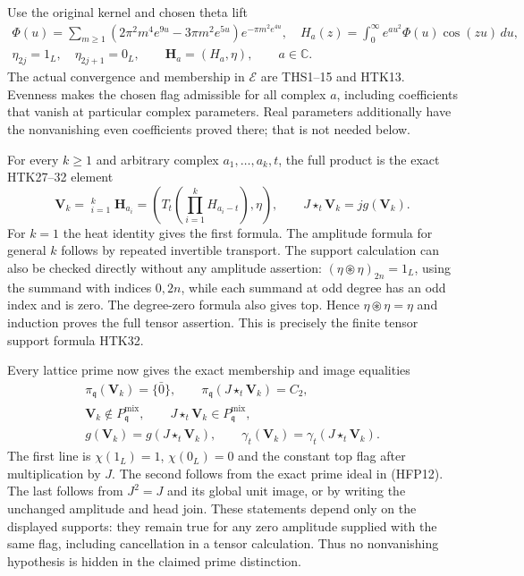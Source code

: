 Use the original kernel and chosen theta lift
\begin{equation}\tag{HFP31}
\begin{gathered}
 \Phi(u)=\sum_{m\ge1}
  (2\pi^2m^4e^{9u}-3\pi m^2e^{5u})e^{-\pi m^2e^{4u}},\quad
 H_a(z)=\int_0^\infty e^{au^2}\Phi(u)\cos(zu)\,du,\\
 \eta_{2j}=1_L,\quad\eta_{2j+1}=0_L,\qquad
 \mathbf H_a=(H_a,\eta),\qquad a\in\mathbb C.
\end{gathered}
\end{equation}
The actual convergence and membership in $\mathcal E$
are THS1--15 and HTK13. Evenness makes the chosen flag
admissible for all complex $a$, including coefficients
that vanish at particular complex parameters. Real
parameters additionally have the nonvanishing even
coefficients proved there; that is not needed below.

For every $k\ge1$ and arbitrary complex $a_1,\ldots,a_k,t$,
the full product is the exact HTK27--32 element
\begin{equation}\tag{HFP32}
 \mathbf V_k=\mathop{\star_t}_{i=1}^k\mathbf H_{a_i}
    =\left(T_t\left(\prod_{i=1}^k H_{a_i-t}\right),\eta\right),
 \qquad J\star_t\mathbf V_k=jg(\mathbf V_k).
\end{equation}
For $k=1$ the heat identity gives the first formula.
The amplitude formula for general $k$ follows by repeated
invertible transport. The support calculation can also
be checked directly without any amplitude assertion:
$(\eta\circledast\eta)_{2n}=1_L$, using the summand
with indices $0,2n$, while each summand at odd degree
has an odd index and is zero. The degree-zero formula
also gives top. Hence $\eta\circledast\eta=\eta$ and
induction proves the full tensor assertion. This is
precisely the finite tensor support formula HTK32.

Every lattice prime now gives the exact membership and
image equalities
\begin{equation}\tag{HFP33}
\boxed{\begin{gathered}
 \pi_{\mathfrak q}(\mathbf V_k)=\{\bar0\},\qquad
 \pi_{\mathfrak q}(J\star_t\mathbf V_k)=C_2,\\
 \mathbf V_k\notin P^{\mathrm{mix}}_{\mathfrak q},\qquad
 J\star_t\mathbf V_k\in P^{\mathrm{mix}}_{\mathfrak q},\\
 g(\mathbf V_k)=g(J\star_t\mathbf V_k),\qquad
 \gamma_t(\mathbf V_k)=\gamma_t(J\star_t\mathbf V_k).
\end{gathered}}
\end{equation}
The first line is $\chi(1_L)=1$, $\chi(0_L)=0$ and the
constant top flag after multiplication by $J$. The
second follows from the exact prime ideal in (HFP12).
The last follows from $J^2=J$ and its global unit image,
or by writing the unchanged amplitude and head join.
These statements depend only on the displayed supports:
they remain true for any zero amplitude supplied with
the same flag, including cancellation in a tensor
calculation. Thus no nonvanishing hypothesis is hidden
in the claimed prime distinction.

